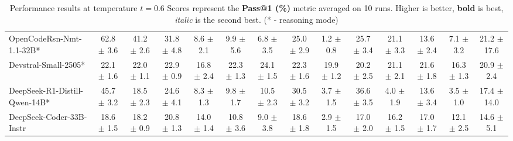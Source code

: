 \documentclass{llmxive}
\begin{document}
\begin{table}[hbt]
{\begin{tabular}{l *{13}{c}}
\rowcolor{gray!10}
OpenCodeRsn-Nmt-1.1-32B* &
62.8 {\tiny$\pm$ 3.6} &
41.2 {\tiny$\pm$ 2.6} &
31.8 {\tiny$\pm$ 4.8} &
8.6 {\tiny$\pm$ 2.1} &
9.9 {\tiny$\pm$ 5.6} &
6.8 {\tiny$\pm$ 3.5} &
25.0 {\tiny$\pm$ 2.9} &
1.2 {\tiny$\pm$ 0.8} &
25.7 {\tiny$\pm$ 3.4} &
21.1 {\tiny$\pm$ 3.3} &
13.6 {\tiny$\pm$ 2.4} &
7.1 {\tiny$\pm$ 3.2} &
21.2 {\tiny$\pm$ 17.6} \\

Devstral-Small-2505* &
22.1 {\tiny$\pm$ 1.6} &
22.0 {\tiny$\pm$ 1.1} &
22.9 {\tiny$\pm$ 0.9} &
16.8 {\tiny$\pm$ 2.4} &
22.3 {\tiny$\pm$ 1.3} &
24.1 {\tiny$\pm$ 1.5} &
22.3 {\tiny$\pm$ 1.6} &
19.9 {\tiny$\pm$ 1.2} &
20.2 {\tiny$\pm$ 2.5} &
21.1 {\tiny$\pm$ 2.1} &
21.6 {\tiny$\pm$ 1.8} &
16.3 {\tiny$\pm$ 1.3} &
20.9 {\tiny$\pm$ 2.4} \\


\rowcolor{gray!10}
DeepSeek-R1-Distill-Qwen-14B* &
45.7 {\tiny$\pm$ 3.2} & 
18.5 {\tiny$\pm$ 2.3} & 
24.6 {\tiny$\pm$ 4.1} & 
8.3 {\tiny$\pm$ 1.3} &
9.8 {\tiny$\pm$ 1.7} & 
10.5 {\tiny$\pm$ 2.3} & 
30.5 {\tiny$\pm$ 3.2} & 
3.7 {\tiny$\pm$ 1.5} &
36.6 {\tiny$\pm$ 3.5} & 
4.0 {\tiny$\pm$ 1.9} & 
13.6 {\tiny$\pm$ 3.4} & 
3.5 {\tiny$\pm$ 1.0} &
17.4 {\tiny$\pm$ 14.0} \\


DeepSeek-Coder-33B-Instr &
18.6 {\tiny$\pm$ 1.5} &
18.2 {\tiny$\pm$ 0.9} &
20.8 {\tiny$\pm$ 1.3} &
14.0 {\tiny$\pm$ 1.4} &
10.8 {\tiny$\pm$ 3.6} &
9.0 {\tiny$\pm$ 3.8} &
18.6 {\tiny$\pm$ 1.8} &
2.9 {\tiny$\pm$ 1.5} &
17.0 {\tiny$\pm$ 2.0} &
16.2 {\tiny$\pm$ 1.5} &
17.0 {\tiny$\pm$ 1.7} &
12.1 {\tiny$\pm$ 2.5} &
14.6 {\tiny$\pm$ 5.1} \\


\bottomrule
\end{tabular}%
}
\caption{Performance results at temperature $t=0.6$
Scores represent the \textbf{Pass@1 (\%)} metric averaged on 10 runs. Higher is better, \textbf{bold} is best, \textit{italic} is the second best. (* - reasoning mode)}
\label{tab_exps_feb25_pass1_avg10_t0.6}
\end{table}
\end{document}

